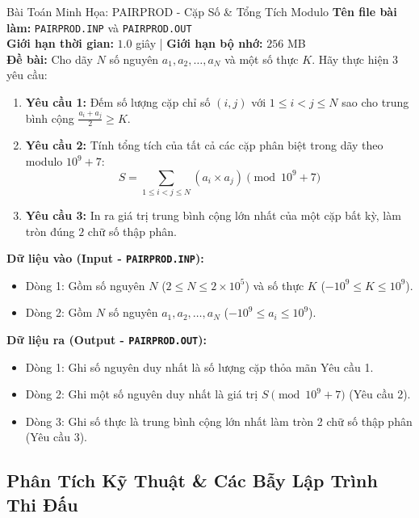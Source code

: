 \documentclass[11pt,a4paper]{article}
\begin{document}
\begin{conceptbox}{Bài Toán Minh Họa: PAIRPROD - Cặp Số \& Tổng Tích Modulo}
    \textbf{Tên file bài làm:} \texttt{PAIRPROD.INP} và \texttt{PAIRPROD.OUT}\\
    \textbf{Giới hạn thời gian:} $1.0$ giây \quad | \quad \textbf{Giới hạn bộ nhớ:} $256$ MB\\
    
    \textbf{Đề bài:} Cho dãy $N$ số nguyên $a_1, a_2, \dots, a_N$ và một số thực $K$. Hãy thực hiện 3 yêu cầu:
    \begin{enumerate}[leftmargin=*]
        \item \textbf{Yêu cầu 1:} Đếm số lượng cặp chỉ số $(i, j)$ với $1 \le i < j \le N$ sao cho trung bình cộng $\frac{a_i + a_j}{2} \ge K$.
        \item \textbf{Yêu cầu 2:} Tính tổng tích của tất cả các cặp phân biệt trong dãy theo modulo $10^9 + 7$:
        $$S = \sum_{1 \le i < j \le N} (a_i \times a_j) \pmod{10^9 + 7}$$
        \item \textbf{Yêu cầu 3:} In ra giá trị trung bình cộng lớn nhất của một cặp bất kỳ, làm tròn đúng $2$ chữ số thập phân.
    \end{enumerate}
    
    \textbf{Dữ liệu vào (Input - \texttt{PAIRPROD.INP}):}
    \begin{itemize}[leftmargin=*]
        \item Dòng 1: Gồm số nguyên $N$ ($2 \le N \le 2 \times 10^5$) và số thực $K$ ($-10^9 \le K \le 10^9$).
        \item Dòng 2: Gồm $N$ số nguyên $a_1, a_2, \dots, a_N$ ($-10^9 \le a_i \le 10^9$).
    \end{itemize}
    
    \textbf{Dữ liệu ra (Output - \texttt{PAIRPROD.OUT}):}
    \begin{itemize}[leftmargin=*]
        \item Dòng 1: Ghi số nguyên duy nhất là số lượng cặp thỏa mãn Yêu cầu 1.
        \item Dòng 2: Ghi một số nguyên duy nhất là giá trị $S \pmod{10^9 + 7}$ (Yêu cầu 2).
        \item Dòng 3: Ghi số thực là trung bình cộng lớn nhất làm tròn 2 chữ số thập phân (Yêu cầu 3).
    \end{itemize}
\end{conceptbox}

\subsection{Phân Tích Kỹ Thuật \& Các Bẫy Lập Trình Thi Đấu}
\end{document}
